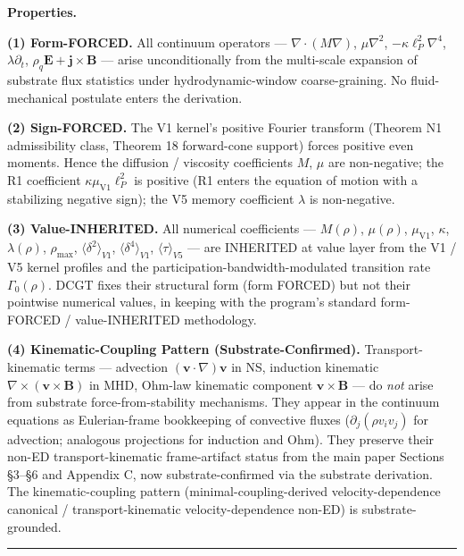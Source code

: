 \documentclass[
]{article}
\begin{document}
\textbf{Properties.}

\textbf{(1) Form-FORCED.} All continuum operators ---
\(\nabla\cdot(M\nabla)\), \(\mu\nabla^2\), \(-\kappa\ell_P^2\nabla^4\),
\(\lambda\partial_t\), \(\rho_q\mathbf{E} + \mathbf{j}\times\mathbf{B}\)
--- arise unconditionally from the multi-scale expansion of substrate
flux statistics under hydrodynamic-window coarse-graining. No
fluid-mechanical postulate enters the derivation.

\textbf{(2) Sign-FORCED.} The V1 kernel's positive Fourier transform
(Theorem N1 admissibility class, Theorem 18 forward-cone support) forces
positive even moments. Hence the diffusion / viscosity coefficients
\(M\), \(\mu\) are non-negative; the R1 coefficient
\(\kappa\mu_\mathrm{V1}\ell_P^2\) is positive (R1 enters the equation of
motion with a stabilizing negative sign); the V5 memory coefficient
\(\lambda\) is non-negative.

\textbf{(3) Value-INHERITED.} All numerical coefficients ---
\(M(\rho)\), \(\mu(\rho)\), \(\mu_\mathrm{V1}\), \(\kappa\),
\(\lambda(\rho)\), \(\rho_\mathrm{max}\),
\(\bigl\langle\delta^2\bigr\rangle_{V1}\),
\(\bigl\langle\delta^4\bigr\rangle_{V1}\),
\(\bigl\langle\tau\bigr\rangle_{V5}\) --- are INHERITED at value layer
from the V1 / V5 kernel profiles and the
participation-bandwidth-modulated transition rate \(\Gamma_0(\rho)\).
DCGT fixes their structural form (form FORCED) but not their pointwise
numerical values, in keeping with the program's standard form-FORCED /
value-INHERITED methodology.

\textbf{(4) Kinematic-Coupling Pattern (Substrate-Confirmed).}
Transport-kinematic terms --- advection
\((\mathbf{v}\cdot\nabla)\mathbf{v}\) in NS, induction kinematic
\(\nabla\times(\mathbf{v}\times\mathbf{B})\) in MHD, Ohm-law kinematic
component \(\mathbf{v}\times\mathbf{B}\) --- do \emph{not} arise from
substrate force-from-stability mechanisms. They appear in the continuum
equations as Eulerian-frame bookkeeping of convective fluxes
(\(\partial_j(\rho v_i v_j)\) for advection; analogous projections for
induction and Ohm). They preserve their non-ED transport-kinematic
frame-artifact status from the main paper Sections §3--§6 and Appendix
C, now substrate-confirmed via the substrate derivation. The
kinematic-coupling pattern (minimal-coupling-derived velocity-dependence
canonical / transport-kinematic velocity-dependence non-ED) is
substrate-grounded.

\begin{center}\rule{0.5\linewidth}{0.5pt}\end{center}
\end{document}
